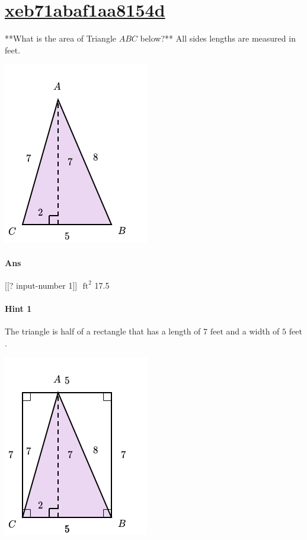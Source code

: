 \documentclass[twocolumn,10pt]{article}
\def\shrinkfactor{0.55}
\begin{document}
\section{\href{https://www.khanacademy.org/devadmin/content/items/xeb71abaf1aa8154d}{xeb71abaf1aa8154d}}

\noindent
**What is the area of Triangle $ABC$ below?**  
All sides lengths are measured in feet.  


\includegraphics[scale=\shrinkfactor]{figures/a11ca0bbe47e9fbe8b9e5754982425eeecb9ed0d.png}

\paragraph{Ans} [[? input-number 1]] $\text { ft}^2$  17.5

\paragraph{Hint 1}The triangle is half of a rectangle that has a length of $7\text{ feet}$ and a width of $5\text{ feet}$.  


\includegraphics[scale=\shrinkfactor]{figures/a47635bf4f64f6617b727742a218c571a7792472.png}
\end{document}
